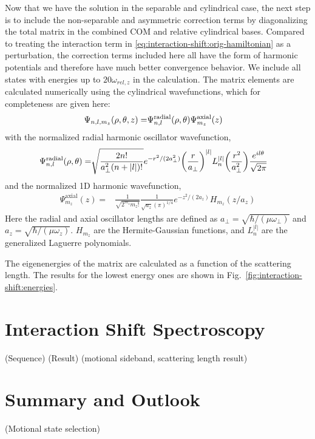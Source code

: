 Now that we have the solution in the separable and cylindrical case,
the next step is to include the non-separable and asymmetric correction terms
by diagonalizing the total matrix in the combined COM and relative cylindrical bases.
Compared to treating the interaction term in \ref{eq:interaction-shift:orig-hamiltonian}
as a perturbation, the correction terms included here all have the form of
harmonic potentials and therefore have much better convergence behavior.
We include all states with energies up to $20 \omega_{rel,z}$ in the calculation.
The matrix elements are calculated numerically using the cylindrical wavefunctions,
which for completeness are given here:
\begin{align*}
  \Psi_{n,l,m_z}{\left({\rho,\theta,z}\right)}=
  &\Psi^{\mathrm{radial}}_{n,l}{\left({\rho, \theta}\right)}\Psi^{\mathrm{axial}}_{m_z}{\left({z}\right)}
\end{align*}
with the normalized radial harmonic oscillator wavefunction,
\begin{align*}
  \Psi^{\mathrm{radial}}_{n,l}{\left({\rho, \theta}\right)}=
  &\sqrt{\frac{2n!}{a_\perp^2 (n+|l|)!}} e^{-r^2/(2 a_\perp^2)} {\left({\frac{r}{a_\perp}}\right)}^{|l|}
    L_n^{|l|}{\left({\frac{r^2}{a_\perp^2}}\right)} \frac{ e^{i l \theta}}{\sqrt{2 \pi}}
\end{align*}
and the normalized 1D harmonic wavefunction,
\begin{align*}
  \Psi^{\mathrm{axial}}_{m_z}(z)=&\frac{1}{\sqrt{2^{m_z} m_z!}} \frac{1}{\sqrt{a_z}(\pi)^{1/4}}
                                   e^{-z^2/(2 a_z)} H_{m_z}( z/a_z)
\end{align*}
Here the radial and axial oscillator lengths are defined as
$a_\perp = \sqrt{\hbar/( \mu \omega_\perp)}$ and $a_z = \sqrt{\hbar/ (\mu \omega_z)}$.
$H_{m_z}$ are the Hermite-Gaussian functions,
and $L^{|l|}_n$ are the generalized Laguerre polynomials.

The eigenenergies of the matrix are calculated as a function of the scattering length.
The results for the lowest energy ones are shown in Fig.~\ref{fig:interaction-shift:energies}.

\section{Interaction Shift Spectroscopy}
(Sequence)
(Result)
\label{ch:interaction-shift:result}
(motional sideband, scattering length result)

\section{Summary and Outlook}
(Motional state selection)
